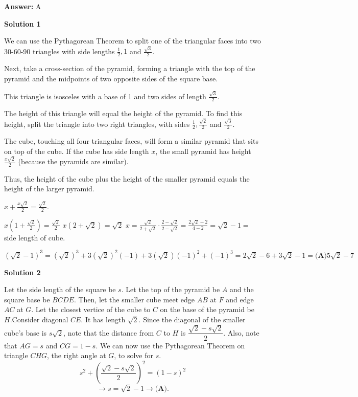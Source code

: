 \begin{enumerate}
 \textbf{Answer: }A



\textbf{Solution 1}

We can use the Pythagorean Theorem to split one of the triangular faces into two 30-60-90 triangles with side lengths $\frac{1}{2}, 1$ and $\frac{\sqrt{3}}{2}$.

 Next, take a cross-section of the pyramid, forming a triangle with the top of the pyramid and the midpoints of two opposite sides of the square base.

 This triangle is isosceles with a base of 1 and two sides of length $\frac{\sqrt{3}}{2}$.

 The height of this triangle will equal the height of the pyramid. To find this height, split the triangle into two right triangles, with sides $\frac{1}{2}, \frac{\sqrt2}{2}$ and $\frac{\sqrt{3}}{2}$.

 The cube, touching all four triangular faces, will form a similar pyramid that sits on top of the cube. If the cube has side length $x$, the small pyramid has height $\frac{x\sqrt{2}}{2}$ (because the pyramids are similar).

 Thus, the height of the cube plus the height of the smaller pyramid equals the height of the larger pyramid.

 $x +\frac{x\sqrt{2}}{2} = \frac{\sqrt2}{2}$.

 $x\left(1+\frac{\sqrt{2}}{2} \right) =\frac{\sqrt{2}}{2}$
$x\left(2+\sqrt{2}\right) = \sqrt{2}$
$x = \frac{\sqrt{2}}{2+\sqrt{2}}  \cdot \frac{2-\sqrt{2}}{2-\sqrt{2}} = \frac{2\sqrt{2}-2}{4-2} = \sqrt{2}-1 =$side length of cube.

 $\left(\sqrt{2}-1\right)^3 = (\sqrt{2})^3 + 3(\sqrt{2})^2(-1) + 3(\sqrt{2})(-1)^2 + (-1)^3 = 2\sqrt{2} - 6 +3\sqrt{2} - 1 =\textbf{(A)} 5\sqrt{2} - 7$




\textbf{Solution 2}

Let the side length of the square be $s$. Let the top of the pyramid be $A$ and the square base be $BCDE$. Then, let the smaller cube meet edge $AB$ at $F$ and edge $AC$ at $G$. Let the closest vertice of the cube to $C$ on the base of the pyramid be $H$.Consider diagonal $CE$. It has length $\sqrt{2}$. Since the diagonal of the smaller cube's base is $s\sqrt{2}$, note that the distance from $C$ to $H$ is $\dfrac{\sqrt{2} - s\sqrt{2}}{2}.$ Also, note that $AG = s$ and $CG = 1-s$. We can now use the Pythagorean Theorem on triangle $CHG$, the right angle at $G$, to solve for $s$. 
 \[s^2 + (\dfrac{\sqrt{2} - s\sqrt{2}}{2})^2 = (1-s)^2\]
 \[\rightarrow s = \sqrt{2} - 1 \rightarrow \boxed{\textbf{(A)}}.\]


\end{enumerate}
